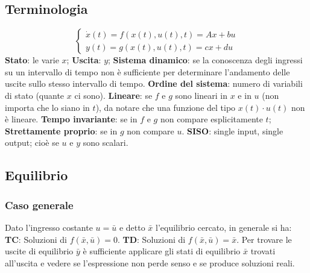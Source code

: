 \fontsize{6pt}{8pt}\selectfont
{}
\begin{landscape}
\begin{multicols*}{3}
    \subsection*{Terminologia}
    \[
        \begin{cases}
            \dot{x}(t) = f(x(t),u(t),t) = Ax + bu\\
            y(t) = g(x(t),u(t),t) = cx +du
        \end{cases}
    \]
    \textbf{Stato}: le varie $x$;\newline
    \textbf{Uscita}: $y$;\newline
    \textbf{Sistema dinamico}: se la conoscenza degli ingressi su un intervallo di tempo
    non è sufficiente per determinare l’andamento delle uscite sullo stesso intervallo di tempo.\newline
    \textbf{Ordine del sistema}: numero di variabili di stato (quante $x$ ci sono).\newline
    \textbf{Lineare}: se $f$ e $g$ sono lineari in $x$ e in $u$ (non importa che lo siano in $t$), da notare che una funzione del tipo $x(t) \cdot u(t)$ non è lineare.\newline
    \textbf{Tempo invariante}: se in $f$ e $g$ non compare esplicitamente $t$;\newline
    \textbf{Strettamente proprio}: se in $g$ non compare $u$.\newline
    \textbf{SISO}: single input, single output; cioè se $u$ e $y$ sono scalari.
    \subsection*{Equilibrio}
    \subsubsection*{Caso generale}
    Dato l'ingresso costante $u = \bar{u}$ e detto $\bar{x}$ l'equilibrio cercato, in generale si ha:\newline
    \textbf{TC}: Soluzioni di $f(\bar{x},\bar{u}) = 0$.\newline
    \textbf{TD}: Soluzioni di $f(\bar{x}, \bar{u}) = \bar{x}$.\newline
    Per trovare le uscite di equilibrio $\bar{y}$ è sufficiente applicare gli stati di equilibrio $\bar{x}$ trovati all'uscita e vedere se l'espressione non perde senso e se produce soluzioni reali.

\end{multicols*}
\end{landscape}
